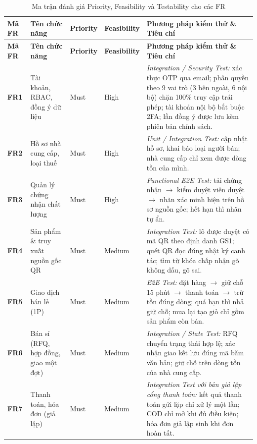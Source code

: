 \begingroup
\tblsetup\tblzebra
\begin{longtable}{L{1.52cm} L{4.20cm} >{\centering\arraybackslash}p{1.65cm} >{\centering\arraybackslash}p{2.00cm} L{4.82cm}}
\caption{Ma trận đánh giá Priority, Feasibility và Testability cho các FR}
\label{tab:fr-matrix} \\
\toprule
{}
\textbf{Mã FR} & \textbf{Tên chức năng} & \textbf{Priority} & \textbf{Feasibility} & \textbf{Phương pháp kiểm thử \& Tiêu chí} \\
\midrule
\endfirsthead
\toprule
{}
\textbf{Mã FR} & \textbf{Tên chức năng} & \textbf{Priority} & \textbf{Feasibility} & \textbf{Phương pháp kiểm thử \& Tiêu chí} \\
\midrule
\endhead
\bottomrule
\endfoot
\textbf{FR1} & Tài khoản, RBAC, đồng ý dữ liệu & Must & High & \textit{Integration / Security Test:} xác thực OTP qua email; phân quyền theo 9 vai trò (3 bên ngoài, 6 nội bộ) chặn 100\% truy cập trái phép; tài khoản nội bộ bắt buộc 2FA; lần đồng ý được lưu kèm phiên bản chính sách. \\
\textbf{FR2} & Hồ sơ nhà cung cấp, loại thuế & Must & High & \textit{Unit / Integration Test:} cập nhật hồ sơ, khai báo loại người bán; nhà cung cấp chỉ xem được dòng tồn của mình. \\
\textbf{FR3} & Quản lý chứng nhận chất lượng & Must & High & \textit{Functional E2E Test:} tải chứng nhận $\rightarrow$ kiểm duyệt viên duyệt $\rightarrow$ nhãn xác minh hiện trên hồ sơ nguồn gốc; hết hạn thì nhãn tự ẩn. \\
\textbf{FR4} & Sản phẩm \& truy xuất nguồn gốc QR & Must & Medium & \textit{Integration Test:} lô được duyệt có mã QR theo định danh GS1; quét QR đọc đúng nhật ký canh tác; tìm từ khóa chấp nhận gõ không dấu, gõ sai. \\
\textbf{FR5} & Giao dịch bán lẻ (1P) & Must & Medium & \textit{E2E Test:} đặt hàng $\rightarrow$ giữ chỗ 15 phút $\rightarrow$ thanh toán $\rightarrow$ trừ tồn đúng dòng; quá hạn thì nhả giữ chỗ; mua lại tạo giỏ chỉ gồm sản phẩm còn bán. \\
\textbf{FR6} & Bán sỉ (RFQ, hợp đồng, giao một đợt) & Must & Medium & \textit{Integration / State Test:} RFQ chuyển trạng thái hợp lệ; xác nhận giao kết lưu đúng mã băm văn bản; giữ chỗ trên dòng tồn của nhà cung cấp. \\
\textbf{FR7} & Thanh toán, hóa đơn (giả lập) & Must & Medium & \textit{Integration Test với bản giả lập cổng thanh toán:} kết quả thanh toán gửi lặp chỉ xử lý một lần; COD chỉ mở khi đủ điều kiện; hóa đơn giả lập sinh khi đơn hoàn tất. \\

\end{longtable}
